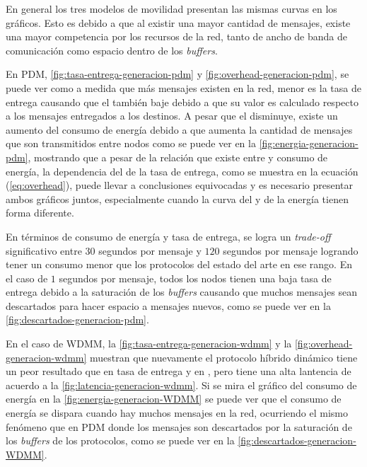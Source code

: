 En general los tres modelos de movilidad presentan las mismas curvas en los
gráficos. Esto es debido a que al existir una mayor cantidad de mensajes, existe
una mayor competencia por los recursos de la red, tanto de ancho de banda de
comunicación como espacio dentro de los \textit{buffers}.


En PDM, \ref{fig:tasa-entrega-generacion-pdm} y
\ref{fig:overhead-generacion-pdm}, se puede ver como a medida que más mensajes
existen en la red, menor es la tasa de entrega causando que el \overhead{}
también baje debido a que su valor es calculado respecto a los mensajes
entregados a los destinos. A pesar que el \overhead{} disminuye, existe un
aumento del consumo de energía debido a que aumenta la cantidad de mensajes que
son transmitidos entre nodos como se puede ver en la
\ref{fig:energia-generacion-pdm}, mostrando que a pesar de la relación que
existe entre \overhead{} y consumo de energía, la dependencia del \overhead{} de
la tasa de entrega, como se muestra en la ecuación (\ref{eq:overhead}), puede
llevar a conclusiones equivocadas y es necesario presentar ambos gráficos
juntos, especialmente cuando la curva del \overhead{} y de la energía tienen
forma diferente.

En términos de consumo de energía y tasa de entrega, se logra un
\textit{trade-off} significativo entre $30$ segundos por mensaje y $120$
segundos por mensaje logrando tener un consumo menor que los protocolos del
estado del arte en ese rango. En el caso de $1$ segundos por mensaje, todos los
nodos tienen una baja tasa de entrega debido a la saturación de los
\textit{buffers} causando que muchos mensajes sean descartados para hacer
espacio a mensajes nuevos, como se puede ver en la
\ref{fig:descartados-generacion-pdm}.

En el caso de WDMM, la \ref{fig:tasa-entrega-generacion-wdmm} y la
\ref{fig:overhead-generacion-wdmm} muestran que nuevamente el protocolo híbrido
dinámico tiene un peor resultado que \syf{} en tasa de entrega y en \overhead,
pero tiene una alta lantencia de acuerdo a la
\ref{fig:latencia-generacion-wdmm}.  Si se mira el gráfico del consumo de
energía en la \ref{fig:energia-generacion-WDMM} se puede ver que el consumo de
energía se dispara cuando hay muchos mensajes en la red, ocurriendo el mismo
fenómeno que en PDM donde los mensajes son descartados por la saturación de los
\textit{buffers} de los protocolos, como se puede ver en la
\ref{fig:descartados-generacion-WDMM}.



